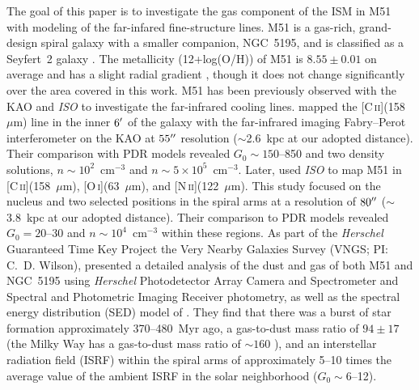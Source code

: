 The goal of this paper is to investigate the gas component of the ISM in M51 with modeling of the far-infared fine-structure lines.  M51 \citep[$D = 9.9$~Mpc; ][]{2009AstL...35..599T} is a gas-rich, grand-design spiral galaxy with a smaller companion, NGC~5195, and is classified as a Seyfert~2 galaxy \citep{1997ApJS..112..315H}.   The metallicity (12+log(O/H)) of M51 is $8.55 \pm 0.01$ on average and has a slight radial gradient \citep{2010ApJS..190..233M}, though it does not change significantly over the area covered in this work.  M51 has been previously observed with the KAO and \emph{ISO} to investigate the far-infrared cooling lines.  \citet{2001ApJ...561..203N} mapped the [C\,\textsc{ii}](158~$\mu$m) line in the inner $6 \mbox{$^\prime$}$ of the galaxy with the far-infrared imaging Fabry--Perot interferometer on the KAO at $55 \mbox{$^{\prime\prime}$}$ resolution ($\sim$2.6~kpc at our adopted distance).  Their comparison with PDR models revealed $G_0 \sim 150$--850 and two density solutions, $n \sim 10^{2}$~cm$^{-3}$ and $n \sim 5 \times 10^{5}$~cm$^{-3}$. Later, \citet{2005A&A...441..961K} used \emph{ISO} to map M51 in [C\,\textsc{ii}](158~$\mu$m), [O\,\textsc{i}](63~$\mu$m), and [N\,\textsc{ii}](122~$\mu$m).  This study focused on the nucleus and two selected positions in the spiral arms at a resolution of $80\mbox{$^{\prime\prime}$}$ ($\sim$3.8~kpc at our adopted distance).  Their comparison to PDR models revealed $G_{0}=20$--30 and $n \sim 10^{4}$~cm$^{-3}$ within these regions.  As part of the \emph{Herschel} Guaranteed Time Key Project the Very Nearby Galaxies Survey (VNGS; PI: C.~D. Wilson), \citet{2012ApJ...755..165M} presented a detailed analysis of the dust and gas of both M51 and NGC~5195 using \emph{Herschel} Photodetector Array Camera and Spectrometer \citep[PACS; ][]{2010A&A...518L...2P} and Spectral and Photometric Imaging Receiver \citep[SPIRE; ][]{2010A&A...518L...3G} photometry, as well as the spectral energy distribution (SED) model of \citet{2007ApJ...657..810D}.  They find that there was a burst of star formation approximately 370--480~Myr ago, a gas-to-dust mass ratio of $94 \pm 17$ (the Milky Way has a gas-to-dust mass ratio of $\sim 160$ \citep[; ][]{2004ApJS..152..211Z}), and an interstellar radiation field (ISRF) within the spiral arms of approximately 5--10 times the average value of the ambient ISRF in the solar neighborhood ($G_{0} \sim 6$--12).

